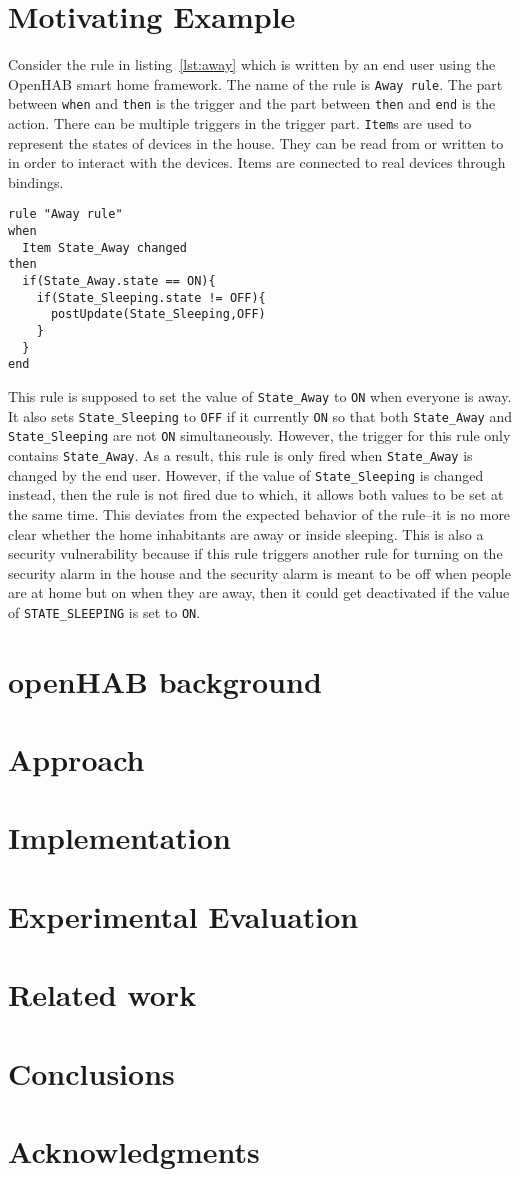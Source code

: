 \documentclass{sig-alternate-05-2015}
\begin{document}
\section{Motivating Example}
Consider the rule in listing~\ref{lst:away} which is written by an end user using the OpenHAB smart home framework. The name of the rule is \texttt{Away rule}. The part between \texttt{when} and \texttt{then} is the trigger and the part between \texttt{then} and \texttt{end} is the action. There can be multiple triggers in the trigger part. \texttt{Item}s are used to represent the states of devices in the house. They can be read from or written to in order to interact with the devices. Items are connected to real devices through bindings.  
\begin{lstlisting}[caption={Rule for setting the Away or Sleeping state},label={lst:away}]
rule "Away rule"
when
  Item State_Away changed 	
then
  if(State_Away.state == ON){
    if(State_Sleeping.state != OFF){
      postUpdate(State_Sleeping,OFF)
    }
  }
end
\end{lstlisting}
This rule is supposed to set the value of \texttt{State\_Away} to \texttt{ON} when everyone is away. It also sets \texttt{State\_Sleeping} to \texttt{OFF} if it currently \texttt{ON} so that both \texttt{State\_Away} and \texttt{State\_Sleeping} are not \texttt{ON} simultaneously. However, the trigger for this rule only contains \texttt{State\_Away}. As a result, this rule is only fired when \texttt{State\_Away} is changed by the end user. However, if the value of \texttt{State\_Sleeping} is changed instead, then the rule is not fired due to which, it allows both values to be set at the same time. This deviates from the expected behavior of the rule--it is no more clear whether the home inhabitants are away or inside sleeping. This is also a security vulnerability because if this rule triggers another rule for turning on the security alarm in the house and the security alarm is meant to be off when people are at home but on when they are away, then it could get deactivated if the value of \texttt{STATE\_SLEEPING} is set to \texttt{ON}. 
\section{\MakeLowercase{open}HAB background}
\section{Approach}
\section{Implementation}
\section{Experimental Evaluation}
\section{Related work}
\cite{smartthings16, todayToTomorrow, rvs, homer, utea}
\section{Conclusions}


\section{Acknowledgments}


  
\end{document}
